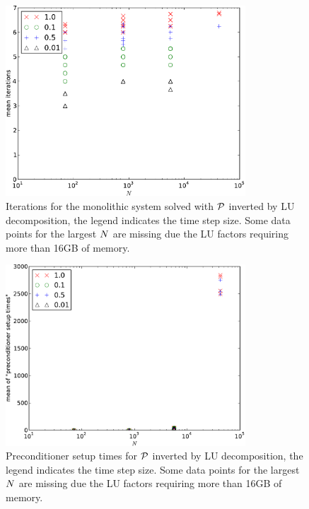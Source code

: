 \begin{figure}
  \centering
  \includegraphics[width=0.8\textwidth]{plots/linear_solvers/som-main-exactimplicitdummy-meanofnsolveritersvsinitialnnode.pdf}
  \caption{Iterations for the monolithic system solved with $\mathcal{P}$ inverted by LU decomposition, the legend indicates the time step size. Some data points for the largest $N$ are missing due the LU factors requiring more than 16GB of memory.}
  \label{fig:its-p1-exact}
\end{figure}


\begin{figure}
  \centering
  \includegraphics[width=0.8\textwidth]{plots/linear_solvers/som-main-exactimplicitdummy-meanofpreconditionersetuptimesvsinitialnnode.pdf}
  \caption{Preconditioner setup times for $\mathcal{P}$ inverted by LU decomposition, the legend indicates the time step size. Some data points for the largest $N$ are missing due the LU factors requiring more than 16GB of memory.}
  \label{fig:times-p1-exact}
\end{figure}


